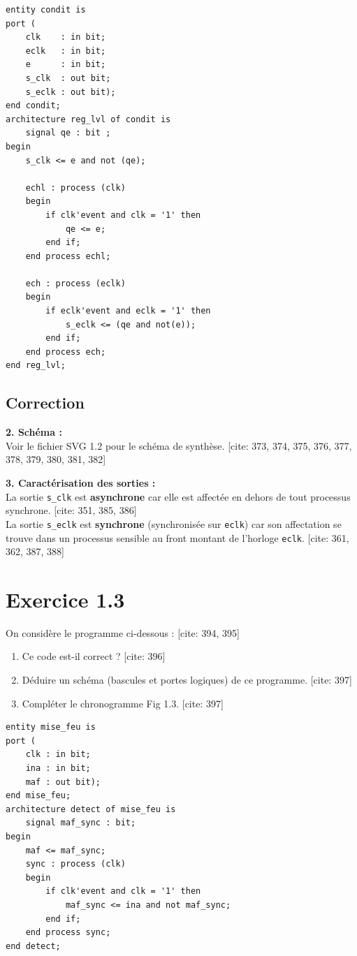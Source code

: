 \documentclass[11pt,a4paper]{article}
\begin{document}
\begin{lstlisting}
entity condit is
port (
    clk    : in bit;
    eclk   : in bit;
    e      : in bit;
    s_clk  : out bit;
    s_eclk : out bit);
end condit;
architecture reg_lvl of condit is
    signal qe : bit ;
begin
    s_clk <= e and not (qe);
    
    echl : process (clk)
    begin
        if clk'event and clk = '1' then
            qe <= e;
        end if;
    end process echl;
    
    ech : process (eclk)
    begin
        if eclk'event and eclk = '1' then
            s_eclk <= (qe and not(e));
        end if;
    end process ech;
end reg_lvl;
\end{lstlisting}

\subsection*{Correction}
\textbf{2. Schéma :}\\
Voir le fichier SVG 1.2 pour le schéma de synthèse. [cite: 373, 374, 375, 376, 377, 378, 379, 380, 381, 382]

\textbf{3. Caractérisation des sorties :}\\
La sortie \texttt{s\_clk} est \textbf{asynchrone} car elle est affectée en dehors de tout processus synchrone. [cite: 351, 385, 386]\\
La sortie \texttt{s\_eclk} est \textbf{synchrone} (synchronisée sur \texttt{eclk}) car son affectation se trouve dans un processus sensible au front montant de l'horloge \texttt{eclk}. [cite: 361, 362, 387, 388]

\section*{Exercice 1.3}
On considère le programme ci-dessous : [cite: 394, 395]
\begin{enumerate}
    \item Ce code est-il correct ? [cite: 396]
    \item Déduire un schéma (bascules et portes logiques) de ce programme. [cite: 397]
    \item Compléter le chronogramme Fig 1.3. [cite: 397]
\end{enumerate}

\begin{lstlisting}
entity mise_feu is
port (
    clk : in bit;
    ina : in bit;
    maf : out bit);
end mise_feu;
architecture detect of mise_feu is
    signal maf_sync : bit;
begin
    maf <= maf_sync;
    sync : process (clk)
    begin
        if clk'event and clk = '1' then
            maf_sync <= ina and not maf_sync;
        end if;
    end process sync;
end detect;
\end{lstlisting}
\end{document}
